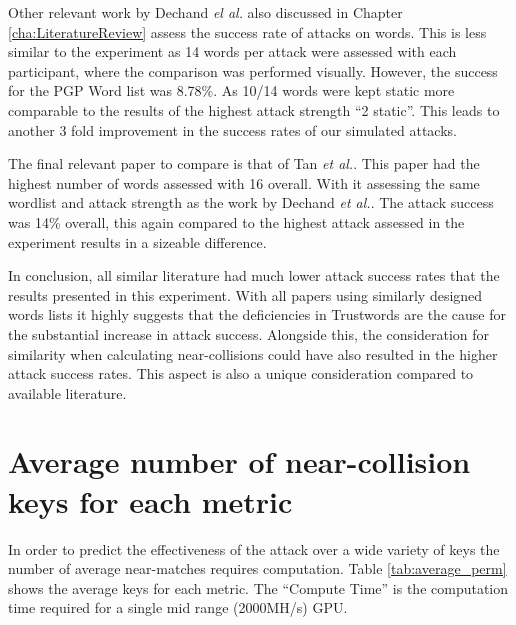 Other relevant work by Dechand \textit{el al.}\cite{dechand2016empirical} also discussed in Chapter \ref{cha:LiteratureReview} assess the success rate of attacks on words. This is less similar to the experiment as 14 words per attack were assessed with each participant, where the comparison was performed visually. However, the success for the PGP Word list was 8.78\%. As 10/14 words were kept static more comparable to the results of the highest attack strength ``2 static''. This leads to another 3 fold improvement in the success rates of our simulated attacks. 

The final relevant paper to compare is that of Tan \textit{et al.}\cite{tan2017can}. This paper had the highest number of words assessed with 16 overall. With it assessing the same wordlist and attack strength as the work by Dechand \textit{et al.}. The attack success was 14\% overall, this again compared to the highest attack assessed in the experiment results in a sizeable difference.

In conclusion, all similar literature had much lower attack success rates that the results presented in this experiment. With all papers using similarly designed words lists it highly suggests that the deficiencies in Trustwords are the cause for the substantial increase in attack success. Alongside this, the consideration for similarity when calculating near-collisions could have also resulted in the higher attack success rates. This aspect is also a unique consideration compared to available literature.


\section{Average number of near-collision keys for each metric}
\label{sec:averagePerms}
In order to predict the effectiveness of the attack over a wide variety of keys the number of average near-matches requires computation. Table \ref{tab:average_perm} shows the average keys for each metric. The ``Compute Time'' is the computation time required for a single mid range (2000MH/s) GPU.


